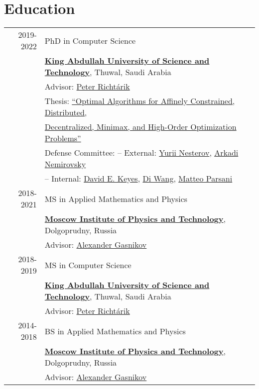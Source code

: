 
\section{Education}
\begin{tabular}{rl}	
	\textsc{2019-2022}& PhD in Computer Science\\
	& \textbf{\href{https://www.kaust.edu.sa/en}{\color{black}King Abdullah University of Science and Technology}}, Thuwal, Saudi Arabia\\
	& Advisor: \href{https://richtarik.org}{Peter Richt\'{a}rik}\\
	& Thesis: \href{https://repository.kaust.edu.sa/handle/10754/682331}{``Optimal Algorithms for Affinely Constrained, Distributed,}\\
	& \hspace{\widthof{Thesis: ``}}\href{https://repository.kaust.edu.sa/handle/10754/682331}{Decentralized, Minimax, and High-Order Optimization Problems''} \\
	& Defense Committee: -- External: \href{https://scholar.google.com/citations?user=DJ8Ep8YAAAAJ}{Yurii Nesterov}, \href{https://scholar.google.com/citations?user=3QxoymwAAAAJ}{Arkadi Nemirovsky}\\
	&\hspace{\widthof{Defense Committee: }}-- Internal: \href{https://scholar.google.com/citations?user=Ps73fz8AAAAJ}{David E. Keyes}, \href{https://shao3wangdi.github.io}{Di Wang}, \href{https://scholar.google.com/citations?user=Vj2D8JQAAAAJ}{Matteo Parsani}\\
	\textsc{2018-2021}& MS in Applied Mathematics and Physics\\
	& \textbf{\href{https://mipt.ru/}{\color{black}Moscow Institute of Physics and Technology}}, Dolgoprudny, Russia\\
	& Advisor: \href{https://scholar.google.com/citations?user=AmeE8qkAAAAJ}{Alexander Gasnikov}\\
	\textsc{2018-2019}& MS in Computer Science\\
	& \textbf{\href{https://www.kaust.edu.sa/en}{\color{black}King Abdullah University of Science and Technology}}, Thuwal, Saudi Arabia\\
	& Advisor: \href{https://richtarik.org}{Peter Richt\'{a}rik}\\
	\textsc{2014-2018}& BS in Applied Mathematics and Physics\\
	& \textbf{\href{https://mipt.ru/}{\color{black}Moscow Institute of Physics and Technology}}, Dolgoprudny, Russia\\
	& Advisor: \href{https://scholar.google.com/citations?user=AmeE8qkAAAAJ}{Alexander Gasnikov}\\
\end{tabular}


